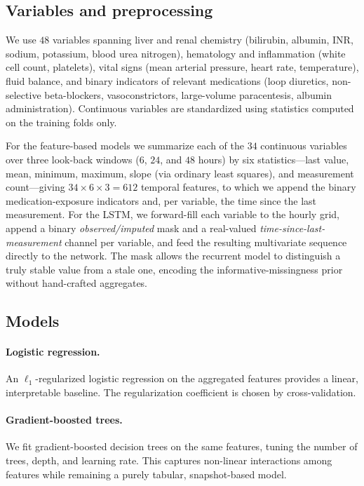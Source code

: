 \documentclass{article}
\begin{document}
\subsection{Variables and preprocessing}

We use $48$ variables spanning liver and renal chemistry (bilirubin, albumin, INR,
sodium, potassium, blood urea nitrogen), hematology and inflammation (white cell
count, platelets), vital signs (mean arterial pressure, heart rate, temperature),
fluid balance, and binary indicators of relevant medications (loop diuretics,
non-selective beta-blockers, vasoconstrictors, large-volume paracentesis, albumin
administration). Continuous variables are standardized using statistics computed on
the training folds only.

For the feature-based models we summarize each of the $34$ continuous variables over
three look-back windows ($6$, $24$, and $48$ hours) by six statistics---last value,
mean, minimum, maximum, slope (via ordinary least squares), and measurement
count---giving $34 \times 6 \times 3 = 612$ temporal features, to which we append the
binary medication-exposure indicators and, per variable, the time since the last
measurement. For the LSTM, we forward-fill each variable to the hourly grid, append a
binary \emph{observed/imputed} mask and a real-valued \emph{time-since-last-
measurement} channel per variable, and feed the resulting multivariate sequence
directly to the network. The mask allows the recurrent model to distinguish a
truly stable value from a stale one, encoding the informative-missingness prior
without hand-crafted aggregates.

\subsection{Models}

\paragraph{Logistic regression.} An $\ell_1$-regularized logistic regression on
the aggregated features provides a linear, interpretable baseline. The
regularization coefficient is chosen by cross-validation.

\paragraph{Gradient-boosted trees.} We fit gradient-boosted decision trees
\citep{Friedman2001} on the same features, tuning the number of trees, depth, and
learning rate. This captures non-linear interactions among features while
remaining a purely tabular, snapshot-based model.
\end{document}
